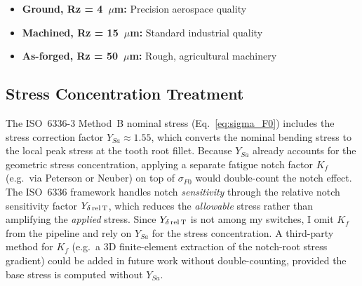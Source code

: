 \documentclass[12pt,a4paper]{article}
\begin{document}
\begin{itemize}
  \item \textbf{Ground, Rz = 4~$\mu$m:} Precision aerospace quality
  \item \textbf{Machined, Rz = 15~$\mu$m:} Standard industrial quality
  \item \textbf{As-forged, Rz = 50~$\mu$m:} Rough, agricultural machinery
\end{itemize}

\subsection{Stress Concentration Treatment}
\label{sec:stress_concentration}

The ISO~6336-3 Method~B nominal stress (Eq.~\ref{eq:sigma_F0}) includes
the stress correction factor $Y_{Sa} \approx 1.55$, which converts the
nominal bending stress to the local peak stress at the tooth root
fillet. Because $Y_{Sa}$ already accounts for the geometric stress
concentration, applying a separate fatigue notch factor $K_f$ (e.g.\
via Peterson or Neuber) on top of $\sigma_{F0}$ would double-count the
notch effect. The ISO~6336 framework handles notch \emph{sensitivity}
through the relative notch sensitivity factor $Y_{\delta\,\rm rel\,T}$,
which reduces the \emph{allowable} stress rather than amplifying the
\emph{applied} stress. Since $Y_{\delta\,\rm rel\,T}$ is not among my
switches, I omit $K_f$ from the pipeline and rely on $Y_{Sa}$ for the
stress concentration. A third-party method for $K_f$ (e.g.\ a 3D
finite-element extraction of the notch-root stress gradient) could be
added in future work without double-counting, provided the base stress
is computed without $Y_{Sa}$.
\end{document}
